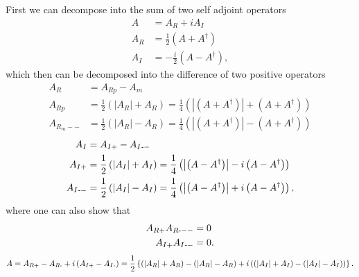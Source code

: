 \documentclass[aps,preprint]{revtex4}%
\begin{document}
First we can decompose into the sum of two self adjoint operators
\begin{align}
A &  =A_{R}+iA_{I}\\
A_{R} &  =\frac{1}{2}\left(  A+A^{\dagger}\right)  \\
A_{I} &  =-\frac{i}{2}\left(  A-A^{\dagger}\right)  ,
\end{align}
which then can be decomposed into the difference of two positive operators%
\begin{align}
A_{R} &  =A_{Rp}-A_{m}\\
A_{Rp} &  =\frac{1}{2}\left(  \left\vert A_{R}\right\vert +A_{R}\right)
=\frac{1}{4}\left(  \left\vert \left(  A+A^{\dagger}\right)  \right\vert
+\left(  A+A^{\dagger}\right)  \right)  \\
A_{R_{m}--} &  =\frac{1}{2}\left(  \left\vert A_{R}\right\vert -A_{R}\right)
=\frac{1}{4}\left(  \left\vert \left(  A+A^{\dagger}\right)  \right\vert
-\left(  A+A^{\dagger}\right)  \right)
\end{align}%
\begin{align}
A_{I} &  =A_{I+}-A_{I\text{\textit{-}}-}\\
A_{I+} &  =\frac{1}{2}\left(  \left\vert A_{I}\right\vert +A_{I}\right)
=\frac{1}{4}\left(  \left\vert \left(  A-A^{\dagger}\right)  \right\vert
-i\left(  A-A^{\dagger}\right)  \right)  \\
A_{I\text{\textit{-}}-} &  =\frac{1}{2}\left(  \left\vert A_{I}\right\vert
-A_{I}\right)  =\frac{1}{4}\left(  \left\vert \left(  A-A^{\dagger}\right)
\right\vert +i\left(  A-A^{\dagger}\right)  \right)  ,
\end{align}
where one can also show that
\begin{align}
A_{R+}A_{R\text{-}--} &  =0\\
A_{I+}A_{I\text{\textit{-}}-} &  =0.
\end{align}%
\begin{equation}
A=A_{R+}-A_{R\text{-}}+i\left(  A_{I+}-A_{I\text{\textit{-}}}\right)
=\frac{1}{2}\left\{  \left(  \left\vert A_{R}\right\vert +A_{R}\right)
-\left(  \left\vert A_{R}\right\vert -A_{R}\right)  +i\left(  \left(
\left\vert A_{I}\right\vert +A_{I}\right)  -\left(  \left\vert A_{I}%
\right\vert -A_{I}\right)  \right)  \right\}  .
\end{equation}
\end{document}
